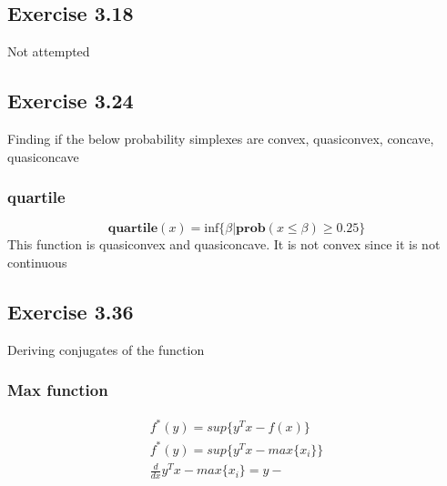 \subsection{Exercise 3.18}
Not attempted
\subsection{Exercise 3.24}
Finding if the below probability simplexes are convex, quasiconvex, concave, quasiconcave
\subsubsection{quartile}
\begin{equation}
  \textbf{quartile}(x) = \text{inf} \{ \beta | \textbf{prob}(x\leq \beta ) \geq 0.25\}
\end{equation}
This function is quasiconvex and quasiconcave. It is not convex since it is not continuous
\subsection{Exercise 3.36}
Deriving conjugates of the function
\subsubsection{Max function}
\begin{gather}
  f^*(y) = sup\{y^Tx - f(x)\} \\
  f^*(y) = sup\{y^Tx - max\{x_i\}\} \\
  \frac{d }{d x}  y^Tx - max\{x_i\} = y -
\end{gather}
